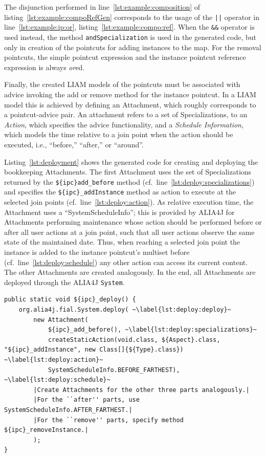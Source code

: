 \documentclass{acm_proc_article-sp}
\begin{document}
The disjunction performed in line~\ref{lst:example:composition} of listing~\ref{lst:example:compoRefGen} corresponds to the usage of the \lstinline{||} operator in line~\ref{lst:example:ip:or}, listing~\ref{lst:example:compo:ref}.
When the \lstinline{&&} operator is used instead, the method \lstinline{andSpecialization} is used in the generated code, but only in creation of the pointcuts for adding instances to the map. For the removal pointcuts, the simple pointcut expression and the instance pointcut reference expression is always \emph{or}ed.

Finally, the created LIAM models of the pointcuts must be associated with advice invoking the add or remove method for the instance pointcut.
In a LIAM model this is achieved by defining an Attachment, which roughly corresponds to a pointcut-advice pair.
An attachment refers to a set of Specializations, to an \emph{Action}, which specifies the advice functionality, and a \emph{Schedule Information}, which models the time relative to a join point when the action should be executed, i.e., ``before,'' ``after,'' or ``around''.

Listing~\ref{lst:deployment} shows the generated code for creating and deploying the bookkeeping Attachments.
The first Attachment uses the set of Specializations returned by the \lstinline!${ipc}add_before! method (cf.\ line~\ref{lst:deploy:specializations}) and specifies the \lstinline!${ipc}_addInstance! method as action to execute at the selected join points (cf.\ line~\ref{lst:deploy:action}).
As relative execution time, the Attachment uses a ``SystemScheduleInfo''; this is provided by ALIA4J for Attachments performing maintenance whose action should be performed before or after all user actions at a join point, such that all user actions observe the same state of the maintained date.
Thus, when reaching a selected join point the instance is added to the instance pointcut's multiset before (cf.\ line~\ref{lst:deploy:schedule}) any other action can access its current content.
The other Attachments are created analogously.
In the end, all Attachments are deployed through the ALIA4J \lstinline{System}.

\begin{lstlisting}[float,caption={Deployment of the bookkeeping for an instance pointcut.},label=lst:deployment]
public static void ${ipc}_deploy() {
	org.alia4j.fial.System.deploy( ~\label{lst:deploy:deploy}~
		new Attachment(
			${ipc}_add_before(), ~\label{lst:deploy:specializations}~
			createStaticAction(void.class, ${Aspect}.class, "${ipc}_addInstance", new Class[]{${Type}.class}) ~\label{lst:deploy:action}~
			SystemScheduleInfo.BEFORE_FARTHEST), ~\label{lst:deploy:schedule}~
		|Create Attachments for the other three parts analogously.|
		|For the ``after'' parts, use SystemScheduleInfo.AFTER_FARTHEST.|
		|For the ``remove'' parts, specify method ${ipc}_removeInstance.|
		);
}
\end{lstlisting}
\end{document}
